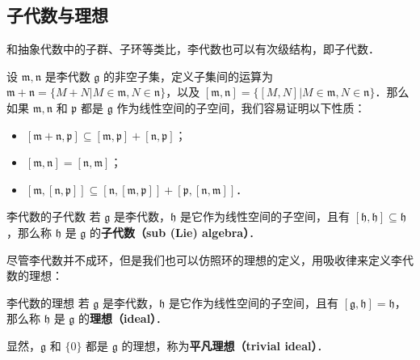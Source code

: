 
\begin{issues}
\end{issues}


\subsection{子代数与理想}
和抽象代数中的子群、子环等类比，李代数也可以有次级结构，即子代数．

设 $\mathfrak{m}, \mathfrak{n}$ 是李代数 $\mathfrak{g}$ 的非空子集，定义子集间的运算为 $\mathfrak{m}+\mathfrak{n}=\{M+N|M\in\mathfrak{m}, N\in\mathfrak{n}\}$，以及 $[\mathfrak{m}, \mathfrak{n}]=\{[M, N]|M\in\mathfrak{m}, N\in\mathfrak{n}\}$．那么如果 $\mathfrak{m}, \mathfrak{n}$ 和 $\mathfrak{p}$ 都是 $\mathfrak{g}$ 作为线性空间的子空间，我们容易证明以下性质：

\begin{itemize}
\item $[\mathfrak{m}+\mathfrak{n}, \mathfrak{p}]\subseteq[\mathfrak{m}, \mathfrak{p}]+[\mathfrak{n}, \mathfrak{p}]$；
\item $[\mathfrak{m},\mathfrak{n}]=[\mathfrak{n}, \mathfrak{m}]$；
\item $[\mathfrak{m}, [\mathfrak{n}, \mathfrak{p}]]\subseteq[\mathfrak{n}, [\mathfrak{m}, \mathfrak{p}]]+[\mathfrak{p}, [\mathfrak{n}, \mathfrak{m}]]$．
\end{itemize}

\begin{definition}{李代数的子代数}
若 $\mathfrak{g}$ 是李代数，$\mathfrak{h}$ 是它作为线性空间的子空间，且有 $[\mathfrak{h}, \mathfrak{h}]\subseteq\mathfrak{h}$，那么称 $\mathfrak{h}$ 是 $\mathfrak{g}$ 的\textbf{子代数（sub (Lie) algebra）}．
\end{definition}


尽管李代数并不成环，但是我们也可以仿照环的理想的定义，用吸收律来定义李代数的理想：

\begin{definition}{李代数的理想}
若 $\mathfrak{g}$ 是李代数，$\mathfrak{h}$ 是它作为线性空间的子空间，且有 $[\mathfrak{g}, \mathfrak{h}]=\mathfrak{h}$，那么称 $\mathfrak{h}$ 是 $\mathfrak{g}$ 的\textbf{理想（ideal）}．

显然，$\mathfrak{g}$ 和 $\{0\}$ 都是 $\mathfrak{g}$ 的理想，称为\textbf{平凡理想（trivial ideal）}．
\end{definition}

